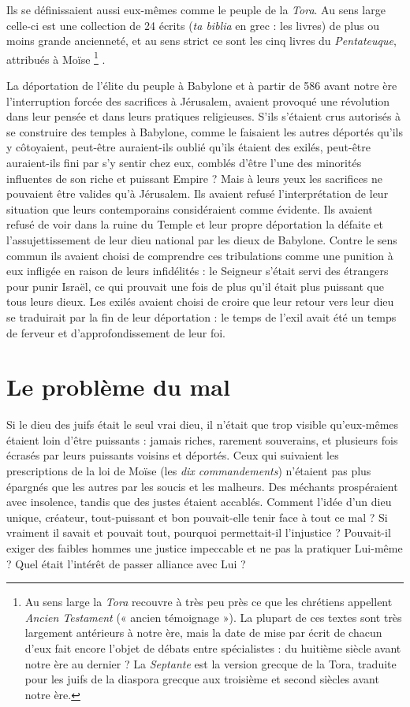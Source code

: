  Ils se définissaient aussi eux-mêmes comme le peuple de la \emph{Tora}. Au sens large celle-ci est une collection de 24 écrits (\emph{ta biblia} en grec : les livres) de plus ou moins grande ancienneté, et au sens strict ce sont les cinq livres du \emph{Pentateuque}, attribués à Moïse%
\footnote{Au sens large la \emph{Tora} recouvre à très peu près ce que les chrétiens appellent \emph{Ancien Testament} (« ancien témoignage »). La plupart de ces textes sont très largement antérieurs à notre ère, mais la date de mise par écrit de chacun d'eux fait encore l'objet de débats entre spécialistes : du huitième siècle avant notre ère au dernier ? La \emph{Septante} est la version grecque de la Tora, traduite pour les juifs de la diaspora grecque aux troisième et second siècles avant notre ère.}%
.

 La déportation de l'élite du peuple à Babylone et à partir de 586 avant notre ère l'interruption forcée des sacrifices à Jérusalem, avaient provoqué une révolution dans leur pensée et dans leurs pratiques religieuses. S'ils s'étaient crus autorisés à se construire des temples à Babylone, comme le faisaient les autres déportés qu'ils y côtoyaient, peut-être auraient-ils oublié qu'ils étaient des exilés, peut-être auraient-ils fini par s'y sentir chez eux, comblés d'être l'une des minorités influentes de son riche et puissant Empire ? Mais à leurs yeux les sacrifices ne pouvaient être valides qu'à Jérusalem. Ils avaient refusé l'interprétation de leur situation que leurs contemporains considéraient comme évidente. Ils avaient refusé de voir dans la ruine du Temple et leur propre déportation la défaite et l'assujettissement de leur dieu national par les dieux de Babylone. Contre le sens commun ils avaient choisi de comprendre ces tribulations comme une punition à eux infligée en raison de leurs infidélités : le Seigneur s'était servi des étrangers pour punir Israël, ce qui prouvait une fois de plus qu'il était plus puissant que tous leurs dieux. Les exilés avaient choisi de croire que leur retour vers leur dieu se traduirait par la fin de leur déportation : le temps de l'exil avait été un temps de ferveur et d'approfondissement de leur foi. 

\section{Le problème du mal}

 Si le dieu des juifs était le seul vrai dieu, il n'était que trop visible qu'eux-mêmes étaient loin d'être puissants : jamais riches, rarement souverains, et plusieurs fois écrasés par leurs puissants voisins et déportés. Ceux qui suivaient les prescriptions de la loi de Moïse (les \emph{dix commandements}) n'étaient pas plus épargnés que les autres par les soucis et les malheurs. Des méchants prospéraient avec insolence, tandis que des justes étaient accablés. Comment l'idée d'un dieu unique, créateur, tout-puissant et bon pouvait-elle tenir face à tout ce mal ? Si vraiment il savait et pouvait tout, pourquoi permettait-il l'injustice ? Pouvait-il exiger des faibles hommes une justice impeccable et ne pas la pratiquer Lui-même ? Quel était l'intérêt de passer alliance avec Lui ? 


